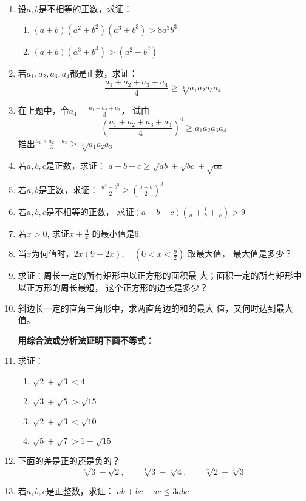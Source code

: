 \begin{enumerate}
\item 设$a,b$是不相等的正数，求证：
\begin{enumerate}
    \item $(a+b)(a^2+b^2)(a^3+b^3)>8a^3b^3$
    \item $(a+b)(a^3+b^3)>(a^2+b^2)$
\end{enumerate}

\item 若$a_1,a_2,a_3,a_4$都是正数，求证：
\[\frac{a_1+a_2+a_3+a_4}{4}\ge \sqrt[4]{a_1a_2a_3a_4}\]
\item 在上题中，令$a_4=\frac{a_1+a_2+a_3}{3}$，
试由\[\left(\frac{a_1+a_2+a_3+a_4}{4}\right)^4\ge a_1a_2a_3a_4\]
推出$\frac{a_1+a_2+a_3}{3}\ge \sqrt[3]{a_1a_2a_3}$

\item 若$a,b,c$是正数，求证：
$a+b+c\ge \sqrt{ab}+\sqrt{bc}+\sqrt{ca}$
\item 若$a,b$是正数，求证：
$\frac{a^3+b^3}{2}\ge \left(\frac{a+b}{2}\right)^3$
\item 若$a,b,c$是不相等的正数，
求证$(a+b+c)\left(\frac{1}{a}+\frac{1}{b}+\frac{1}{c}\right)>9$

\item 若$x>0$, 求证$x+\frac{9}{x}$
的最小值是6.
\item 当$x$为何值时，$2x(9-2x),\quad \left(0<x<\frac{9}{2}\right)$
取最大值，
最大值是多少？
\item 求证：周长一定的所有矩形中以正方形的面积最
大；面积一定的所有矩形中以正方形的周长最短，
这个正方形的边长是多少？
\item  斜边长一定的直角三角形中，求两直角边的和的最大
值，又何时达到最大值。


\textbf{用综合法或分析法证明下面不等式：}

\item 求证：
\begin{multicols}{2}
\begin{enumerate}
    \item $\sqrt{2}+\sqrt{3}<4$
    \item $\sqrt{3}+\sqrt{5}>\sqrt{15}$
    \item $\sqrt{2}+\sqrt{3}<\sqrt{10}$
    \item $\sqrt{5}+\sqrt{7}>1+\sqrt{15}$
\end{enumerate}    
\end{multicols}

\item 下面的差是正的还是负的？
\[\sqrt[3]{3}-\sqrt{2},\qquad \sqrt[4]{3}-\sqrt[5]{4},\qquad \sqrt[5]{2}-\sqrt[6]{3} \]
\item 若$a,b,c$是正整数，求证：
$ab+bc+ac\le 3abc$


\end{enumerate}
